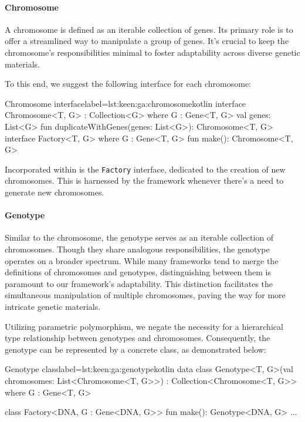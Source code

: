   \paragraph{Chromosome}
    A chromosome is defined as an iterable collection of genes.
    Its primary role is to offer a streamlined way to manipulate a group 
    of genes.
    It's crucial to keep the chromosome's responsibilities minimal to 
    foster adaptability across diverse genetic materials.
    
    To this end, we suggest the following interface for each chromosome:
    
    \begin{code}{Chromosome interface}{label={lst:keen:ga:chromosome}}{kotlin}
      interface Chromosome<T, G> : Collection<G> where G : Gene<T, G> {
          val genes: List<G>
          fun duplicateWithGenes(genes: List<G>): Chromosome<T, G>
          interface Factory<T, G> where G : Gene<T, G> {
              fun make(): Chromosome<T, G>
          }
      }
    \end{code}
    
    Incorporated within is the \texttt{Factory} interface, dedicated to 
    the creation of new chromosomes.
    This is harnessed by the framework whenever there's a need to generate 
    new chromosomes.

  \paragraph{Genotype}
    Similar to the chromosome, the genotype serves as an iterable collection 
    of chromosomes.
    Though they share analogous responsibilities, the genotype operates on a 
    broader spectrum.
    While many frameworks tend to merge the definitions of chromosomes and 
    genotypes, distinguishing between them is paramount to our framework's 
    adaptability.
    This distinction facilitates the simultaneous manipulation of multiple 
    chromosomes, paving the way for more intricate genetic materials.
    
    Utilizing parametric polymorphism, we negate the necessity for a 
    hierarchical type relationship between genotypes and chromosomes.
    Consequently, the genotype can be represented by a concrete class, as 
    demonstrated below:
    
    \begin{code}{Genotype class}{label={lst:keen:ga:genotype}}{kotlin}
      data class Genotype<T, G>(val chromosomes: List<Chromosome<T, G>>) :
          Collection<Chromosome<T, G>> where G : Gene<T, G> {
    
          class Factory<DNA, G : Gene<DNA, G>> {
              fun make(): Genotype<DNA, G> { ... }
          }
      }
    \end{code}
    
